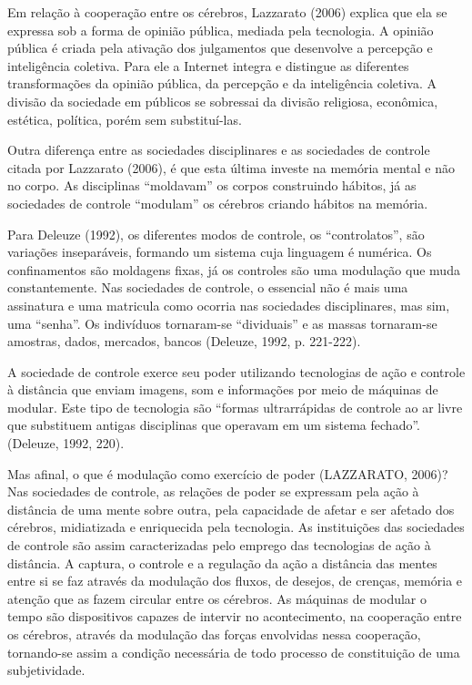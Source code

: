 Em relação à cooperação entre os cérebros, Lazzarato (2006) explica que
ela se expressa sob a forma de opinião pública, mediada pela tecnologia.
A opinião pública é criada pela ativação dos julgamentos que desenvolve
a percepção e inteligência coletiva. Para ele a Internet integra e
distingue as diferentes transformações da opinião pública, da percepção
e da inteligência coletiva. A divisão da sociedade em públicos se
sobressai da divisão religiosa, econômica, estética, política, porém sem
substituí-las.

Outra diferença entre as sociedades disciplinares e as sociedades de
controle citada por Lazzarato (2006), é que esta última investe na
memória mental e não no corpo. As disciplinas ``moldavam'' os corpos
construindo hábitos, já as sociedades de controle ``modulam'' os
cérebros criando hábitos na memória.

Para Deleuze (1992), os diferentes modos de controle, os
``controlatos'', são variações inseparáveis, formando um sistema cuja
linguagem é numérica. Os confinamentos são moldagens fixas, já os
controles são uma modulação que muda constantemente. Nas sociedades de
controle, o essencial não é mais uma assinatura e uma matricula como
ocorria nas sociedades disciplinares, mas sim, uma ``senha''. Os
indivíduos tornaram-se ``dividuais'' e as massas tornaram-se amostras,
dados, mercados, bancos (Deleuze, 1992, p. 221-222).

A sociedade de controle exerce seu poder utilizando tecnologias de ação
e controle à distância que enviam imagens, som e informações por meio de
máquinas de modular. Este tipo de tecnologia são ``formas ultrarrápidas
de controle ao ar livre que substituem antigas disciplinas que operavam
em um sistema fechado''. (Deleuze, 1992, 220).

Mas afinal, o que é modulação como exercício de poder (LAZZARATO, 2006)?
Nas sociedades de controle, as relações de poder se expressam pela ação
à distância de uma mente sobre outra, pela capacidade de afetar e ser
afetado dos cérebros, midiatizada e enriquecida pela tecnologia. As
instituições das sociedades de controle são assim caracterizadas pelo
emprego das tecnologias de ação à distância. A captura, o controle e a
regulação da ação a distância das mentes entre si se faz através da
modulação dos fluxos, de desejos, de crenças, memória e atenção que as
fazem circular entre os cérebros. As máquinas de modular o tempo são
dispositivos capazes de intervir no acontecimento, na cooperação entre
os cérebros, através da modulação das forças envolvidas nessa
cooperação, tornando-se assim a condição necessária de todo processo de
constituição de uma subjetividade.

